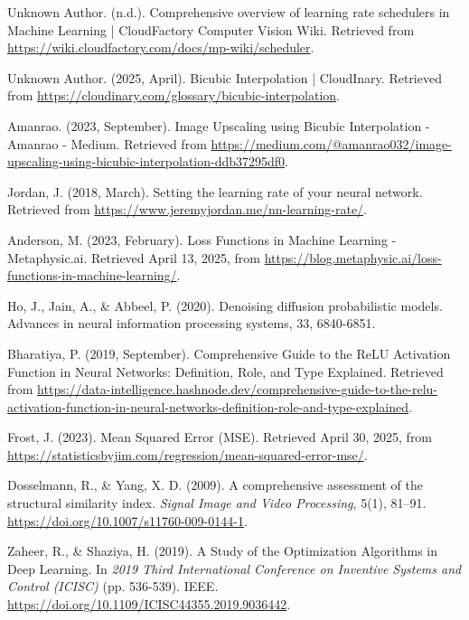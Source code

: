 \documentclass[twocolumn]{article}
\begin{document}
\begin{thebibliography}{99}
     Unknown Author. (n.d.). Comprehensive overview of learning rate schedulers in Machine Learning | CloudFactory Computer Vision Wiki. Retrieved from \url{https://wiki.cloudfactory.com/docs/mp-wiki/scheduler}.
    
     Unknown Author. (2025, April). Bicubic Interpolation | CloudInary. Retrieved from \url{https://cloudinary.com/glossary/bicubic-interpolation}.
    
     Amanrao. (2023, September). Image Upscaling using Bicubic Interpolation - Amanrao - Medium. Retrieved from \url{https://medium.com/@amanrao032/image-upscaling-using-bicubic-interpolation-ddb37295df0}.
    
     Jordan, J. (2018, March). Setting the learning rate of your neural network. Retrieved from \url{https://www.jeremyjordan.me/nn-learning-rate/}.
    
     Anderson, M. (2023, February). Loss Functions in Machine Learning - Metaphysic.ai. Retrieved April 13, 2025, from \url{https://blog.metaphysic.ai/loss-functions-in-machine-learning/}.
    
     Ho, J., Jain, A., \& Abbeel, P. (2020). Denoising diffusion probabilistic models. Advances in neural information processing systems, 33, 6840-6851.

     Bharatiya, P. (2019, September). Comprehensive Guide to the ReLU Activation Function in Neural Networks: Definition, Role, and Type Explained. Retrieved from \href{https://data-intelligence.hashnode.dev/comprehensive-guide-to-the-relu-activation-function-in-neural-networks-definition-role-and-type-explained}{https://data-intelligence.hashnode.dev/comprehensive-guide-to-the-relu-activation-function-in-neural-networks-definition-role-and-type-explained}.
    
     Frost, J. (2023). Mean Squared Error (MSE). Retrieved April 30, 2025, from \url{https://statisticsbyjim.com/regression/mean-squared-error-mse/}.
    
     Dosselmann, R., \& Yang, X. D. (2009). A comprehensive assessment of the structural similarity index. \textit{Signal Image and Video Processing}, 5(1), 81–91. \url{https://doi.org/10.1007/s11760-009-0144-1}.
    
     Zaheer, R., \& Shaziya, H. (2019). A Study of the Optimization Algorithms in Deep Learning. In \textit{2019 Third International Conference on Inventive Systems and Control (ICISC)} (pp. 536-539). IEEE. \url{https://doi.org/10.1109/ICISC44355.2019.9036442}.
    

\end{thebibliography}
\end{document}
